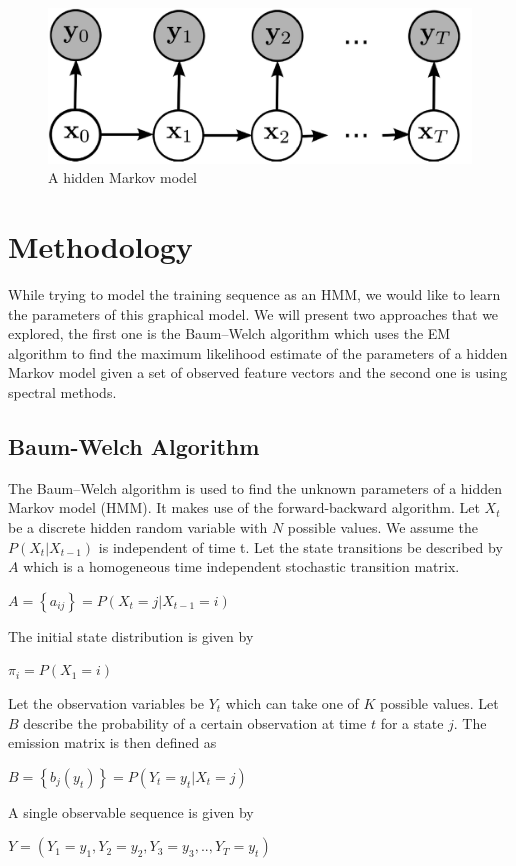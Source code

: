 \documentclass[letterpaper]{article}
\begin{document}
\begin{figure}[h]
\includegraphics[scale=0.2]{"hmm"}
\caption{A hidden Markov model}
\end{figure}

\section{Methodology}

While trying to model the training sequence as an HMM, we would like to learn the parameters of this graphical model. We will present two approaches that we explored, the first one is the Baum–Welch algorithm which uses the EM algorithm to find the maximum likelihood estimate of the parameters of a hidden Markov model given a set of observed feature vectors and the second one is using spectral methods.

\subsection{Baum-Welch Algorithm}

The Baum–Welch algorithm is used to find the unknown parameters of a hidden Markov model (HMM). It makes use of the forward-backward algorithm. Let $X_{t}$ be a discrete hidden random variable with $N$ possible values. We assume the $P(X_{t}|X_{t-1})$ is independent of time t. Let the state transitions be described by $A$ which is a homogeneous time independent stochastic transition matrix. 
\begin{center}
$A = \left\lbrace a_{ij} \right\rbrace = P(X_{t}=j|X_{t-1}=i)$
\end{center}
The initial state distribution is given by
\begin{center}
$\pi_{i} = P(X_{1}=i)$
\end{center}
Let the observation variables be $Y_{t}$ which can take one of $K$ possible values. Let $B$ describe the probability of a certain observation at time $t$ for a state $j$. The emission matrix is then defined as
\begin{center}
$B = \left\lbrace b_{j}(y_{t}) \right\rbrace = P(Y_{t}=y_{t}|X_{t}=j)$
\end{center}
A single observable sequence is given by 
\begin{center}
$Y = (Y_{1}=y_{1},Y_{2}=y_{2},Y_{3}=y_{3},..,Y_{T}=y_{t})$
\end{center}
\end{document}
